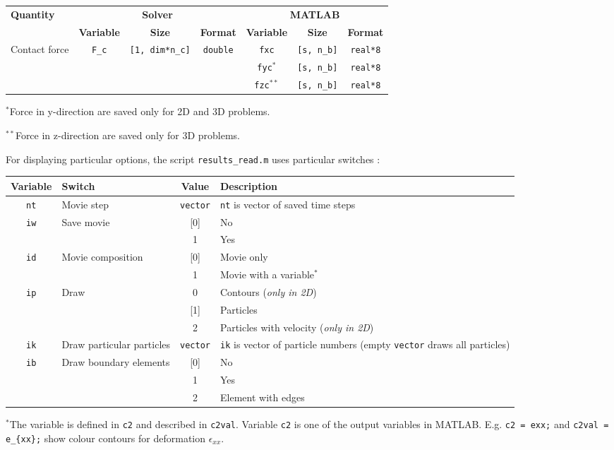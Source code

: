{\footnotesize
\begin{tabular}{|l|c|c|c|c|c|c|}%
\hline
\multirow{2}{*}{\bf Quantity} & \multicolumn{3}{c|}{\bf Solver} &\multicolumn{3}{c|}{\bf MATLAB} \\ \cline{2-7}
& {\bf Variable} & {\bf Size} & {\bf Format} & {\bf Variable} & {\bf Size} & {\bf Format} \\ \hline
\multirow{3}{15mm}{Contact force} & \multirow{3}{*}{\texttt{F\_c}} & \multirow{3}{*}{\texttt{[1, dim*n\_c]}} & \multirow{3}{*}{\texttt{double}} & \texttt{fxc} & \texttt{[s, n\_b]}& \texttt{real*8}\\ \cline{5-7}
& & & & \texttt{fyc}$^*$ & \texttt{[s, n\_b]}& \texttt{real*8} \\ \cline{5-7}
& & & & \texttt{fzc}$^{**}$ & \texttt{[s, n\_b]}& \texttt{real*8} \\ \hline
\end{tabular}
}

$^*$Force in y-direction are saved only for 2D and 3D problems.

$^{**}$Force in z-direction are saved only for 3D problems.

For displaying particular options, the script \texttt{results\_read.m} uses particular switches :

\begin{tabular}{|c|l|c|l|}
\hline
{\bf Variable} & {\bf Switch} & {\bf Value} & {\bf Description} \\ \hline
\texttt{nt} & Movie step & \texttt{vector} & \texttt{nt} is vector of saved time steps \\ \hline
\multirow{2}{*}{\texttt{iw}} & \multirow{2}{1in}{Save movie} & [0] & No \\ \cline{3-4}
& & 1 & Yes \\ \hline
\multirow{2}{*}{\texttt{id}} & \multirow{2}{1in}{Movie composition} & [0] & Movie only \\ \cline{3-4}
& & 1 & Movie with a variable$^*$ \\ \hline
\multirow{3}{*}{\texttt{ip}} & \multirow{3}{1in}{Draw} & 0 & Contours ({\it only in 2D}) \\ \cline{3-4}
& & [1] & Particles \\ \cline{3-4}
& & 2 & Particles with velocity ({\it only in 2D}) \\ \cline{3-4} \hline
\multirow{2}{*}{\texttt{ik}} & \multirow{2}{4cm}{Draw particular particles} & \multirow{2}{*}{\texttt{vector}} & \multirow{2}{3in}{\texttt{ik} is vector of particle numbers (empty \texttt{vector} draws all particles)} \\
& & & \\ \hline
\multirow{3}{*}{\texttt{ib}} & \multirow{3}{4cm}{Draw boundary elements} & [0] & No \\ \cline{3-4}
& & 1 & Yes \\ \cline{3-4}
& & 2 & Element with edges \\ \hline
\end{tabular}

$^*$The variable is defined in \texttt{c2} and described in \texttt{c2val}. Variable \texttt{c2} is one of the output variables in MATLAB. E.g. \texttt{c2 = exx;} and \texttt{c2val = e\_\{xx\};} show colour contours for deformation $\epsilon_{xx}$.
